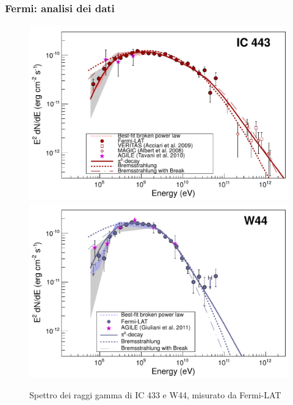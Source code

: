 \documentclass[10pt]{beamer}
\begin{document}
\begin{frame}
  \frametitle{Fermi: analisi dei dati}
  \begin{figure}
    \centering
    \includegraphics[width=0.5\columnwidth]{1231160fig2a}
    \includegraphics[width=0.5\columnwidth]{1231160fig2b}
    \caption{Spettro dei raggi gamma di IC 433 e W44, misurato da Fermi-LAT}
  \end{figure}
\end{frame}
\end{document}
